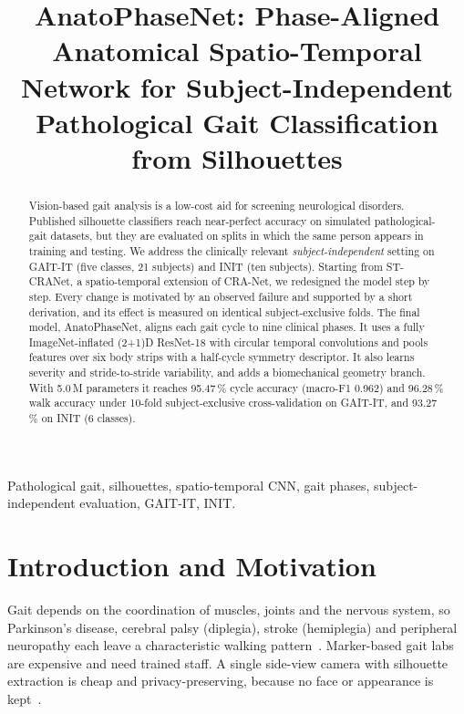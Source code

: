\documentclass[conference]{IEEEtran}
\begin{document}
\title{AnatoPhaseNet: Phase-Aligned Anatomical Spatio-Temporal Network for
Subject-Independent Pathological Gait Classification from Silhouettes}

\author{
}

\maketitle

\begin{abstract}
Vision-based gait analysis is a low-cost aid for screening neurological
disorders. Published silhouette classifiers reach near-perfect accuracy on
simulated pathological-gait datasets, but they are evaluated on splits in which
the same person appears in training and testing. We address the clinically
relevant \emph{subject-independent} setting on GAIT-IT (five classes, 21
subjects) and INIT (ten subjects). Starting from ST-CRANet, a spatio-temporal
extension of CRA-Net, we redesigned the model step by step. Every change is
motivated by an observed failure and supported by a short derivation, and its
effect is measured on identical subject-exclusive folds. The final model,
AnatoPhaseNet, aligns each gait cycle to nine clinical phases. It uses a fully
ImageNet-inflated (2+1)D ResNet-18 with circular temporal convolutions and pools
features over six body strips with a half-cycle symmetry descriptor. It also
learns severity and stride-to-stride variability, and adds a biomechanical
geometry branch. With 5.0\,M parameters it reaches 95.47\,\% cycle accuracy
(macro-F1 0.962) and 96.28\,\% walk accuracy under 10-fold subject-exclusive
cross-validation on GAIT-IT, and 93.27\,\% on INIT (6 classes).
\end{abstract}

\begin{IEEEkeywords}
Pathological gait, silhouettes, spatio-temporal CNN, gait phases,
subject-independent evaluation, GAIT-IT, INIT.
\end{IEEEkeywords}

\section{Introduction and Motivation}
Gait depends on the coordination of muscles, joints and the nervous system, so
Parkinson's disease, cerebral palsy (diplegia), stroke (hemiplegia) and
peripheral neuropathy each leave a characteristic walking
pattern~\cite{dietz2013,baker2018}. Marker-based gait labs are expensive and need
trained staff. A single side-view camera with silhouette extraction is cheap and
privacy-preserving, because no face or appearance is kept~\cite{albuquerque2021}.
\end{document}
